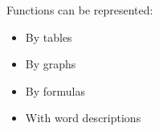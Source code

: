 \documentclass[9pt,xcolor=x11names,compress]{beamer}
\begin{document}
\begin{frame}[c]
\begin{columns}
\begin{column}{.5\linewidth}
Functions can be represented:
\begin{itemize}
	\item \alert<5>{By tables}
	\item \alert<6>{By graphs}
	\item \alert<7>{By formulas}
	\item \alert<8>{With word descriptions}
\end{itemize}
\end{column}
\begin{column}{0.5\linewidth}
\end{column}
\end{columns}
\end{frame}
\end{document}
